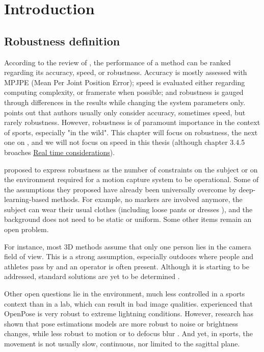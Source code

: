 \pagebreak
\minitoc
\newpage


\section{Introduction}
\subsection{Robustness definition}

According to the review of \cite{Desmarais2021}, the performance of a method can be ranked regarding its accuracy, speed, or robustness. Accuracy is mostly assessed with MPJPE (Mean Per Joint Position Error); speed is evaluated either regarding computing complexity, or framerate when possible; and robustness is gauged through differences in the results while changing the system parameters only. \cite{Desmarais2021} points out that authors usually only consider accuracy, sometimes speed, but rarely robustness. However, robustness is of paramount importance in the context of sports, especially "in the wild". This chapter will focus on robustness, the next one on , and we will not focus on speed in this thesis (although chapter 3.4.5 broaches \hyperref[subsec:realtime]{Real time considerations}).

\cite{Moeslund2001} proposed to express robustness as the number of constraints on the subject or on the environment required for a motion capture system to be operational. Some of the assumptions they proposed have already been universally overcome by deep-learning-based methods. For example, no markers are involved anymore, the subject can wear their usual clothes (including loose pants or dresses \cite{Viswakumar2019}), and the background does not need to be static or uniform. Some other items remain an open problem.

For instance, most 3D methods assume that only one person lies in the camera field of view. This is a strong assumption, especially outdoors where people and athletes pass by and an operator is often present. Although it is starting to be addressed, standard solutions are yet to be determined \cite{Slembrouck2020,Bridgeman2019, Chu2021, Dong2019}. 

Other open questions lie in the environment, much less controlled in a sports context than in a lab, which can result in bad image qualities. \cite{Viswakumar2019} experienced that OpenPose is very robust to extreme lightning conditions. However, research has shown that pose estimations models are more robust to noise or brightness changes, while less robust to motion or to defocus blur \cite{Wang2021b}. And yet, in sports, the movement is not usually slow, continuous, nor limited to the sagittal plane.

